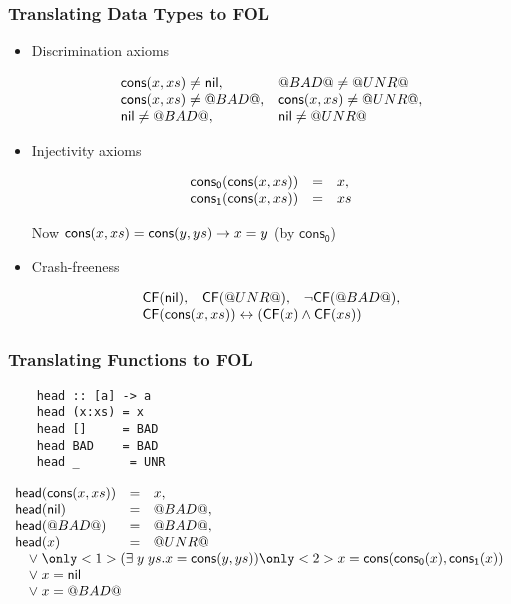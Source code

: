 \documentclass[serif,professionalfont]{beamer}
\begin{document}
\begin{frame}[fragile]
  \frametitle{Translating Data Types to FOL}

  \begin{itemize}
  \item Discrimination axioms

  \[\begin{array}{ll}
  \mathsf{cons}(x,xs) \neq \mathsf{nil}, & @BAD@ \neq @UNR@ \\
  \mathsf{cons}(x,xs) \neq @BAD@, & \mathsf{cons}(x,xs) \neq @UNR@, \\
  \mathsf{nil} \neq @BAD@,         & \mathsf{nil} \neq @UNR@
  \end{array}\]

  \item Injectivity axioms

  \[\begin{array}{lcl}
    \mathsf{cons_0}(\mathsf{cons}(x,xs)) & = & x, \\
    \mathsf{cons_1}(\mathsf{cons}(x,xs)) & = & xs
  \end{array}\]

  Now $\mathsf{cons}(x,xs) = \mathsf{cons}(y,ys) \to x = y$ (by $\mathsf{cons_0}$)

  \item Crash-freeness

  \[\begin{array}{lll}
  \cf(\nil), & \cf(\unr), & \neg \cf(\bad), \\
  \multicolumn{3}{l}{\cf(\cons{x}{xs}) \leftrightarrow (\cf(x) \land \cf(xs))}
  \end{array}\]
  \end{itemize}

\end{frame}

\begin{frame}[fragile]
  \frametitle{Translating Functions to FOL}

  \begin{verbatim}
    head :: [a] -> a
    head (x:xs) = x
    head []     = BAD
    head BAD    = BAD
    head _       = UNR
  \end{verbatim}

  \[\begin{array}{lll}
  \head{\cons{x}{xs}} & = & x,    \\
  \head{\nil}         & = & \bad, \\
  \head{\bad}         & = & \bad, \\
  \head{x}            & = & \unr \\
  \multicolumn{3}{l}{\quad \lor \; \only<1>{(\exists \; y \; ys . x = \cons{y}{ys})}
                                   \only<2>{x = \cons{\conspi{x}}{\conspii{x}}}} \\
  \multicolumn{3}{l}{\quad \lor \; x = \nil} \\
  \multicolumn{3}{l}{\quad \lor \; x = \bad}
  \end{array}\]
\end{frame}
\end{document}
